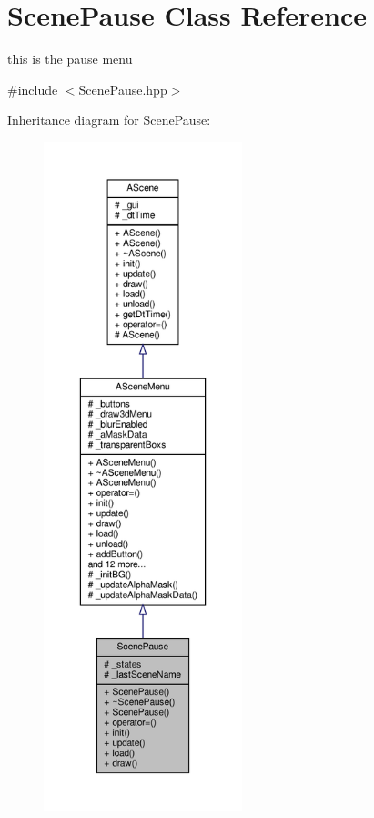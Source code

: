 \hypertarget{class_scene_pause}{}\section{Scene\+Pause Class Reference}
\label{class_scene_pause}


this is the pause menu  




{\ttfamily \#include $<$Scene\+Pause.\+hpp$>$}



Inheritance diagram for Scene\+Pause\+:
\nopagebreak
\begin{figure}[H]
\begin{center}
\leavevmode
\includegraphics[height=550pt]{class_scene_pause__inherit__graph}
\end{center}
\end{figure}


